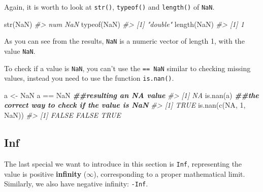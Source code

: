 \documentclass[
]{book}
\newenvironment{Shaded}{\begin{snugshade}}{\end{snugshade}}
\newcommand{\CommentTok}[1]{\textcolor[rgb]{0.56,0.35,0.01}{\textit{#1}}}
\newcommand{\ConstantTok}[1]{\textcolor[rgb]{0.00,0.00,0.00}{#1}}
\newcommand{\DecValTok}[1]{\textcolor[rgb]{0.00,0.00,0.81}{#1}}
\newcommand{\DocumentationTok}[1]{\textcolor[rgb]{0.56,0.35,0.01}{\textbf{\textit{#1}}}}
\newcommand{\FunctionTok}[1]{\textcolor[rgb]{0.00,0.00,0.00}{#1}}
\newcommand{\NormalTok}[1]{#1}
\newcommand{\OtherTok}[1]{\textcolor[rgb]{0.56,0.35,0.01}{#1}}
\newcommand{\SpecialCharTok}[1]{\textcolor[rgb]{0.00,0.00,0.00}{#1}}
\begin{document}
Again, it is worth to look at \texttt{str()}, \texttt{typeof()} and \texttt{length()} of \texttt{NaN}.

\begin{Shaded}
\begin{Highlighting}[]
\FunctionTok{str}\NormalTok{(}\ConstantTok{NaN}\NormalTok{)}
\CommentTok{\#\textgreater{}  num NaN}
\FunctionTok{typeof}\NormalTok{(}\ConstantTok{NaN}\NormalTok{)}
\CommentTok{\#\textgreater{} [1] "double"}
\FunctionTok{length}\NormalTok{(}\ConstantTok{NaN}\NormalTok{)}
\CommentTok{\#\textgreater{} [1] 1}
\end{Highlighting}
\end{Shaded}

As you can see from the results, \texttt{NaN} is a numeric vector of length 1, with the value \texttt{NaN}.

To check if a value is \texttt{NaN}, you can't use the \texttt{==\ NaN} similar to checking missing values, instead you need to use the function \texttt{is.nan()}.

\begin{Shaded}
\begin{Highlighting}[]
\NormalTok{a }\OtherTok{\textless{}{-}} \ConstantTok{NaN}
\NormalTok{a }\SpecialCharTok{==} \ConstantTok{NaN}       \DocumentationTok{\#\#resulting an NA value}
\CommentTok{\#\textgreater{} [1] NA}
\FunctionTok{is.nan}\NormalTok{(a)      }\DocumentationTok{\#\#the correct way to check if the value is NaN}
\CommentTok{\#\textgreater{} [1] TRUE}
\FunctionTok{is.nan}\NormalTok{(}\FunctionTok{c}\NormalTok{(}\ConstantTok{NA}\NormalTok{, }\DecValTok{1}\NormalTok{, }\ConstantTok{NaN}\NormalTok{))}
\CommentTok{\#\textgreater{} [1] FALSE FALSE  TRUE}
\end{Highlighting}
\end{Shaded}

\hypertarget{Inf}{%
\subsection{Inf}\label{Inf}}

The last special we want to introduce in this section is \texttt{Inf}, representing the value is positive \textbf{infinity} (\(\infty\)), corresponding to a proper mathematical limit. Similarly, we also have negative infinity: \texttt{-Inf}.
\end{document}
